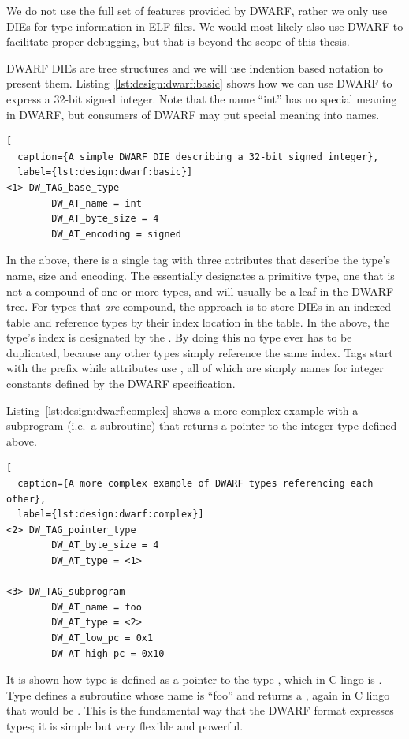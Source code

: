 We do not use the full set of features provided by DWARF, rather we only use
DIEs for type information in ELF files. We would most likely also use DWARF to
facilitate proper debugging, but that is beyond the scope of this thesis.

DWARF DIEs are tree structures and we will use indention based notation to
present them. Listing~\ref{lst:design:dwarf:basic} shows how we can use DWARF to
express a 32-bit signed integer. Note that the name ``int'' has no special
meaning in DWARF, but consumers of DWARF may put special meaning into names.

\begin{lstlisting}[
  caption={A simple DWARF DIE describing a 32-bit signed integer},
  label={lst:design:dwarf:basic}]
<1> DW_TAG_base_type
        DW_AT_name = int
        DW_AT_byte_size = 4
        DW_AT_encoding = signed
\end{lstlisting}

In the above, there is a single tag with three attributes that describe the
type's name, size and encoding. The  essentially
designates a primitive type, one that is not a compound of one or more types,
and will usually be a leaf in the DWARF tree. For types that \emph{are}
compound, the approach is to store DIEs in an indexed table and reference types
by their index location in the table. In the above, the type's index is
designated by the . By doing this no type ever has to be duplicated,
because any other types simply reference the same index. Tags start with the
 prefix while attributes use , all of which are
simply names for integer constants defined by the DWARF specification.

Listing~\ref{lst:design:dwarf:complex} shows a more complex example with a
subprogram (i.e.~a subroutine) that returns a pointer to the integer type
defined above.

\begin{lstlisting}[
  caption={A more complex example of DWARF types referencing each other},
  label={lst:design:dwarf:complex}]
<2> DW_TAG_pointer_type
        DW_AT_byte_size = 4
        DW_AT_type = <1>

<3> DW_TAG_subprogram
        DW_AT_name = foo
        DW_AT_type = <2>
        DW_AT_low_pc = 0x1
        DW_AT_high_pc = 0x10
\end{lstlisting}

It is shown how type  is defined as a pointer to the type ,
which in C lingo is . Type  defines a subroutine whose name
is ``foo'' and returns a , again in C lingo that would be . This is the fundamental way that the DWARF format expresses types; it
is simple but very flexible and powerful.


